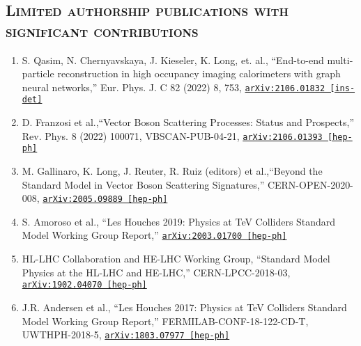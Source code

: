 \documentclass[10pt]{res} %
\begin{document}
\begin{resume}
\section{\textsc{Limited authorship publications with significant contributions}}
\begin{enumerate}\addtocounter{enumi}{12}
  \item S. Qasim, N. Chernyavskaya, J. Kieseler, K. Long, et. al., ``End-to-end multi-particle reconstruction in high occupancy imaging calorimeters with graph neural networks,'' 
    Eur. Phys. J. C 82 (2022) 8, 753, \href{https://arxiv.org/abs/2106.01832}{\texttt{arXiv:2106.01832 [ins-det]}}
  \item D. Franzosi et al.,``Vector Boson Scattering Processes: Status and Prospects,''
    Rev. Phys. 8 (2022) 100071, VBSCAN-PUB-04-21, \href{https://arxiv.org/abs/2106.01393}{\texttt{arXiv:2106.01393 [hep-ph]}}
  \item M. Gallinaro, K. Long, J. Reuter, R. Ruiz (editors) et al.,``Beyond the Standard Model in Vector Boson Scattering Signatures,''
    CERN-OPEN-2020-008, \href{https://arxiv.org/abs/2005.09889}{\texttt{arXiv:2005.09889 [hep-ph]}}
  \item S. Amoroso et al., ``Les Houches 2019: Physics at TeV Colliders Standard Model Working Group Report,''
    \href{https://arxiv.org/abs/2003.01700 } {\texttt{arXiv:2003.01700 [hep-ph]}}
  \item HL-LHC Collaboration and HE-LHC Working Group, ``Standard Model Physics at the HL-LHC and HE-LHC,''
    CERN-LPCC-2018-03, \href{https://arxiv.org/abs/1902.04070}{\texttt{arXiv:1902.04070 [hep-ph]}}
  \item J.R. Andersen et al., ``Les Houches 2017: Physics at TeV Colliders Standard Model Working Group Report,''
    FERMILAB-CONF-18-122-CD-T, UWTHPH-2018-5, \href{https://arxiv.org/abs/1803.07977}{\texttt{arXiv:1803.07977 [hep-ph]}}
\end{enumerate}


\end{resume}
\end{document}
